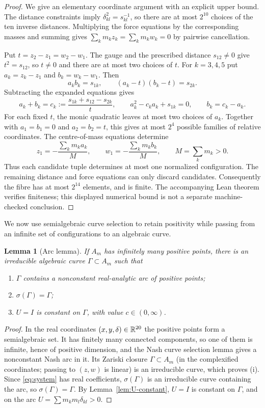 \documentclass[Threeside,11pt]{article}
\newtheorem{lemma}[theorem]{Lemma}
\theoremstyle{definition}
\theoremstyle{remark}
\numberwithin{equation}{section}
\theoremstyle{remark}
\newenvironment{romanlist}{\begin{enumerate}\renewcommand{\labelenumi}{(\roman{enumi})}%
  \renewcommand{\theenumi}{\roman{enumi}}}{\end{enumerate}}
\begin{document}
\begin{proof}
We give an elementary coordinate argument with an explicit upper bound.
The distance constraints imply $\delta_{kl}^2=s_{kl}^{-1}$, so there are at most
$2^{10}$ choices of the ten inverse distances. Multiplying the force equations
by the corresponding masses and summing gives
$\sum_k m_kz_k=\sum_k m_kw_k=0$ by pairwise cancellation.

Put $t=z_2-z_1=w_2-w_1$. The gauge and the prescribed distance $s_{12}\ne0$
give $t^2=s_{12}$, so $t\ne0$ and there are at most two choices of $t$.
For $k=3,4,5$ put $a_k=z_k-z_1$ and $b_k=w_k-w_1$. Then
\[
 a_kb_k=s_{1k},\qquad (a_k-t)(b_k-t)=s_{2k}.
\]
Subtracting the expanded equations gives
\[
 a_k+b_k=c_k:=\frac{s_{1k}+s_{12}-s_{2k}}{t},\qquad
 a_k^2-c_ka_k+s_{1k}=0,\qquad b_k=c_k-a_k.
\]
For each fixed $t$, the monic quadratic leaves at most two choices of $a_k$.
Together with $a_1=b_1=0$ and $a_2=b_2=t$, this gives at most $2^4$ possible
families of relative coordinates. The centre-of-mass equations determine
\[
 z_1=-\frac{\sum_km_ka_k}{M},\qquad
 w_1=-\frac{\sum_km_kb_k}{M},\qquad M=\sum_km_k>0.
\]
Thus each candidate tuple determines at most one normalized configuration.
The remaining distance and force equations can only discard candidates.
Consequently the fibre has at most $2^{14}$ elements, and is finite.
The accompanying Lean theorem verifies finiteness; this displayed numerical
bound is not a separate machine-checked conclusion.
\end{proof}

We now use semialgebraic curve selection to retain positivity while passing from an infinite
set of configurations to an algebraic curve.

\begin{lemma}[Arc lemma]\label{lem:arc}
If $A_m$ has infinitely many positive points, there is an irreducible algebraic curve
$\Gamma\subset A_m$ such that
\begin{romanlist}
  \item $\Gamma$ contains a nonconstant real-analytic arc of positive points;
  \item $\sigma(\Gamma)=\Gamma$;
  \item $U=I$ is constant on $\Gamma$, with value $c\in(0,\infty)$.
\end{romanlist}
\end{lemma}

\begin{proof}
In the real coordinates $(x,y,\delta)\in\mathbb R^{20}$ the positive points form a semialgebraic set.
It has finitely many connected components, so one of them is infinite, hence of positive
dimension, and the Nash curve selection lemma \cite[Prop.~8.1.13]{BCR} gives a nonconstant Nash arc in
it.  Its Zariski closure $\Gamma\subset A_m$ (in the complexified coordinates; passing to $(z,w)$ is linear) is an
irreducible curve, which proves (i).  Since \eqref{eq:system} has real coefficients, $\sigma(
\Gamma)$ is an irreducible curve containing the arc, so $\sigma(\Gamma)=\Gamma$.  By
Lemma~\ref{lem:U-constant}, $U=I$ is constant on $\Gamma$, and on the arc
$U=\sum m_km_l\delta_{kl}>0$.
\end{proof}
\end{document}
